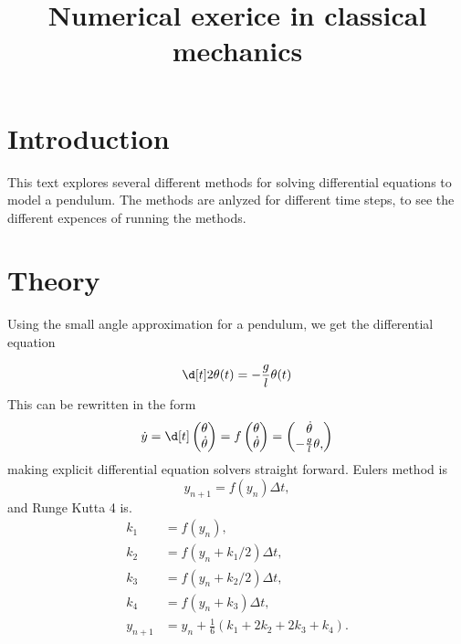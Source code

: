 \documentclass{article}
\title{Numerical exerice in classical mechanics}
\begin{document}
    \section*{Introduction}
    This text explores several different methods for solving differential equations to model a pendulum. The methods are anlyzed for different time steps, to see the different expences of running the methods.
    
    \section*{Theory}
    Using the small angle approximation for a pendulum, we get the differential equation
    
    \begin{equation*}
        \d[t]2 \theta(t) = -\frac{g}{l} \theta(t)
    \end{equation*}
    This can be rewritten in the form
        \begin{equation*}
            \dot y = \d[t]
            \begin{pmatrix}
                \theta \\
                \dot \theta
            \end{pmatrix}
            = f 
            \begin{pmatrix}
                \theta \\
                \dot \theta
            \end{pmatrix}
             =
            \begin{pmatrix}
                \dot \theta \\
                -\frac{g}{l} \theta,
            \end{pmatrix} 
        \end{equation*}  
    making explicit differential equation solvers straight forward. Eulers method is
    \begin{equation*}
        y_{n + 1} = f(y_n) \Delta t,
    \end{equation*}
    and Runge Kutta 4 is.
    \begin{align*}
        k_1 &= f(y_n) ,\\
        k_2 &= f(y_n + k_1 / 2)\Delta t, \\
        k_3 &= f(y_n + k_2 / 2)\Delta t, \\
        k_4 &= f(y_n + k_3)\Delta t, \\
        y_{n + 1} &= y_n + \frac{1}{6}(k_1 + 2k_2 + 2k_3 + k_4).
    \end{align*}
\end{document}
